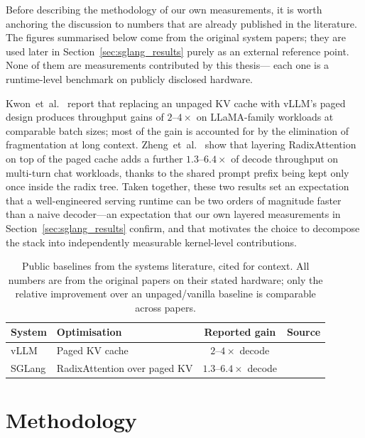 Before describing the methodology of our own measurements, it is
worth anchoring the discussion to numbers that are already
published in the literature. The figures summarised below come
from the original system papers; they are used later in
Section~\ref{sec:sglang_results} purely as an external reference
point. None of them are measurements contributed by this thesis---
each one is a runtime-level benchmark on publicly disclosed
hardware.

Kwon~et~al.~\cite{vllm} report that replacing an unpaged KV cache
with vLLM's paged design produces throughput gains of
$2$--$4\times$ on LLaMA-family workloads at comparable batch
sizes; most of the gain is accounted for by the elimination of
fragmentation at long context.
Zheng~et~al.~\cite{sglang} show that layering RadixAttention on
top of the paged cache adds a further $1.3$--$6.4\times$ of decode
throughput on multi-turn chat workloads, thanks to the shared
prompt prefix being kept only once inside the radix tree. Taken
together, these two results set an expectation that a
well-engineered serving runtime can be two orders of magnitude
faster than a naive decoder---an expectation that our own layered
measurements in Section~\ref{sec:sglang_results} confirm, and
that motivates the choice to decompose the stack into
independently measurable kernel-level contributions.

\begin{table}[h]
\centering
\caption{Public baselines from the systems literature, cited for
         context. All numbers are from the original papers on their
         stated hardware; only the relative improvement over an
         unpaged/vanilla baseline is comparable across
         papers.}\label{tab:sglang_public}
\begin{tabular}{llcc}
\toprule
\textbf{System} & \textbf{Optimisation} & \textbf{Reported gain} & \textbf{Source} \\
\midrule
vLLM     & Paged KV cache                    & $2$--$4\times$ decode   & \cite{vllm}  \\
SGLang   & RadixAttention over paged KV      & $1.3$--$6.4\times$ decode & \cite{sglang} \\
\bottomrule
\end{tabular}
\end{table}

\section{Methodology}\label{sec:sglang_method}

